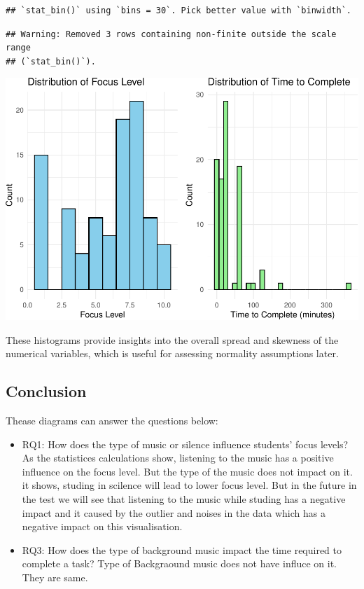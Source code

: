 \documentclass[
]{article}
\begin{document}
\begin{verbatim}
## `stat_bin()` using `bins = 30`. Pick better value with `binwidth`.
\end{verbatim}

\begin{verbatim}
## Warning: Removed 3 rows containing non-finite outside the scale range
## (`stat_bin()`).
\end{verbatim}

\includegraphics{Assignment2_files/figure-latex/unnamed-chunk-4-1.pdf}

These histograms provide insights into the overall spread and skewness
of the numerical variables, which is useful for assessing normality
assumptions later.

\subsection{Conclusion}\label{conclusion}

Thease diagrams can answer the questions below:

\begin{itemize}
\item
  RQ1: How does the type of music or silence influence students' focus
  levels? As the statistices calculations show, listening to the music
  has a positive influence on the focus level. But the type of the music
  does not impact on it. it shows, studing in scilence will lead to
  lower focus level. But in the future in the test we will see that
  listening to the music while studing has a negative impact and it
  caused by the outlier and noises in the data which has a negative
  impact on this visualisation.
\item
  RQ3: How does the type of background music impact the time required to
  complete a task? Type of Backgraound music does not have influce on
  it. They are same.
\end{itemize}
\end{document}
